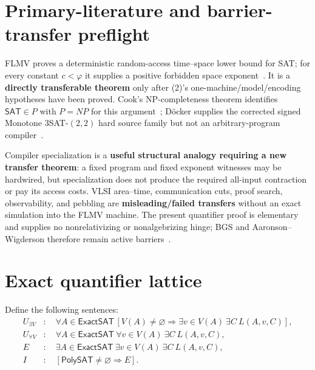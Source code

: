\documentclass[11pt]{article}
\newcommand{\SAT}{\mathsf{SAT}}
\newcommand{\Dec}{\mathsf{ExactSAT}}
\newcommand{\PolySAT}{\mathsf{PolySAT}}
\begin{document}
\section{Primary-literature and barrier-transfer preflight}
FLMV proves a deterministic random-access time--space lower bound for SAT;
for every constant $c<\varphi$ it supplies a positive forbidden space
exponent~\cite{FLMV05}.  It is a \textbf{directly transferable theorem}
only after (2)'s one-machine/model/encoding hypotheses have been proved.
Cook's NP-completeness theorem identifies $\SAT\in P$ with $P=NP$ for this
argument~\cite{Cook71}; D\"ocker supplies the corrected signed
Monotone $3$SAT-$(2,2)$ hard source family but not an arbitrary-program
compiler~\cite{Docker20}.

Compiler specialization is a \textbf{useful structural analogy requiring a
new transfer theorem}: a fixed program and fixed exponent witnesses may be
hardwired, but specialization does not produce the required all-input
contraction or pay its access costs.  VLSI area--time, communication cuts,
proof search, observability, and pebbling are \textbf{misleading/failed
transfers} without an exact simulation into the FLMV machine.  The present
quantifier proof is elementary and supplies no nonrelativizing or
nonalgebrizing hinge; BGS and Aaronson--Wigderson therefore remain active
barriers~\cite{BGS75,AW09}.

\section{Exact quantifier lattice}
Define the following sentences:
\begin{align*}
U_{\exists V}&:\quad
 \forall A\in\Dec\,[V(A)\ne\varnothing\Rightarrow
 \exists v\in V(A)\ \exists C\ L(A,v,C)],\\
U_{\forall V}&:\quad
 \forall A\in\Dec\ \forall v\in V(A)\ \exists C\ L(A,v,C),\\
E&:\quad \exists A\in\Dec\ \exists v\in V(A)\ \exists C\ L(A,v,C),\\
I&:\quad [\PolySAT\ne\varnothing\Rightarrow E].
\end{align*}
\end{document}
